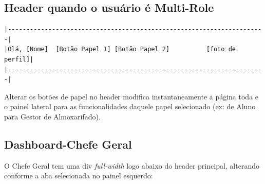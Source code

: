\documentclass[12pt,a4paper]{article}
\begin{document}
\subsection{Header quando o usuário é Multi-Role}
\begin{verbatim}
|----------------------------------------------------------------------|
|Olá, [Nome]  [Botão Papel 1] [Botão Papel 2]          [foto de perfil]| 
|----------------------------------------------------------------------|
\end{verbatim}
Alterar os botões de papel no header modifica instantaneamente a página toda e o painel lateral para as funcionalidades daquele papel selecionado (ex: de Aluno para Gestor de Almoxarifado).

\subsection{Dashboard-Chefe Geral}
O Chefe Geral tem uma div \textit{full-width} logo abaixo do header principal, alterando conforme a aba selecionada no painel esquerdo:
\end{document}

